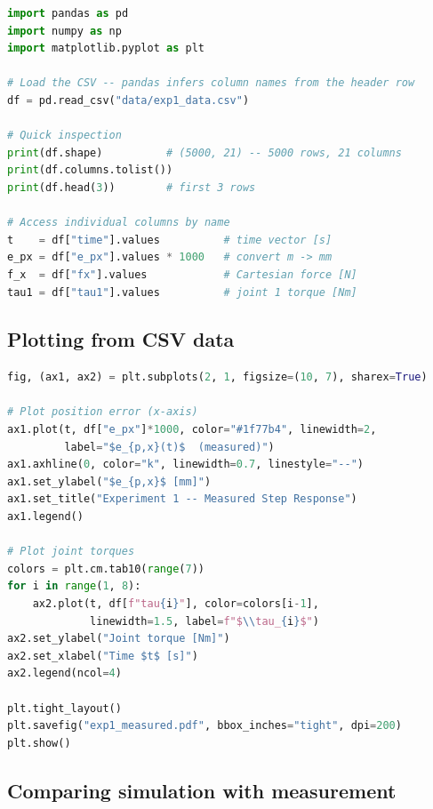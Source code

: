 \begin{lstlisting}[style=cppstyle, language=Python,
  caption={Loading and inspecting a CSV file with pandas},
  label={lst:csv_read}]
import pandas as pd
import numpy as np
import matplotlib.pyplot as plt

# Load the CSV -- pandas infers column names from the header row
df = pd.read_csv("data/exp1_data.csv")

# Quick inspection
print(df.shape)          # (5000, 21) -- 5000 rows, 21 columns
print(df.columns.tolist())
print(df.head(3))        # first 3 rows

# Access individual columns by name
t    = df["time"].values          # time vector [s]
e_px = df["e_px"].values * 1000   # convert m -> mm
f_x  = df["fx"].values            # Cartesian force [N]
tau1 = df["tau1"].values          # joint 1 torque [Nm]
\end{lstlisting}

\subsection{Plotting from CSV data}

\begin{lstlisting}[style=cppstyle, language=Python,
  caption={Plotting position error and joint torques from measured data},
  label={lst:csv_plot}]
fig, (ax1, ax2) = plt.subplots(2, 1, figsize=(10, 7), sharex=True)

# Plot position error (x-axis)
ax1.plot(t, df["e_px"]*1000, color="#1f77b4", linewidth=2,
         label="$e_{p,x}(t)$  (measured)")
ax1.axhline(0, color="k", linewidth=0.7, linestyle="--")
ax1.set_ylabel("$e_{p,x}$ [mm]")
ax1.set_title("Experiment 1 -- Measured Step Response")
ax1.legend()

# Plot joint torques
colors = plt.cm.tab10(range(7))
for i in range(1, 8):
    ax2.plot(t, df[f"tau{i}"], color=colors[i-1],
             linewidth=1.5, label=f"$\\tau_{i}$")
ax2.set_ylabel("Joint torque [Nm]")
ax2.set_xlabel("Time $t$ [s]")
ax2.legend(ncol=4)

plt.tight_layout()
plt.savefig("exp1_measured.pdf", bbox_inches="tight", dpi=200)
plt.show()
\end{lstlisting}

\subsection{Comparing simulation with measurement}

